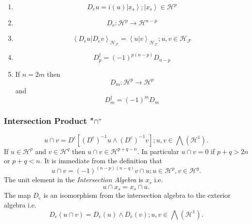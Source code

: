 \documentclass[aps,preprint]{revtex4}%
\begin{document}
\begin{enumerate}
\item
\begin{equation}
D_{e}u=i\left(  u\right)  \left\vert x_{s}\right\rangle ;\left\vert
x_{s}\right\rangle \in\mathcal{H}^{p}%
\end{equation}


\item
\begin{equation}
D_{e}:\mathcal{H}^{p}\rightarrow\mathcal{H}^{n-p}%
\end{equation}


\item
\begin{equation}
\left\langle \left.  D_{e}u\right\vert D_{e}v\right\rangle _{\mathcal{H}%
_{\mathcal{F}}}=\left\langle \left.  u\right\vert v\right\rangle
_{\mathcal{H}_{\mathcal{F}}};u,v\in\mathcal{H}_{\mathcal{F}}%
\end{equation}


\item
\begin{equation}
D_{p}^{\dagger}=\left(  -1\right)  ^{p\left(  n-p\right)  }D_{n-p}%
\end{equation}


\item If $n=2m$ then
\begin{equation}
D_{m}:\mathcal{H}^{p}\rightarrow\mathcal{H}^{p}%
\end{equation}
and%
\begin{equation}
D_{m}^{\dagger}=\left(  -1\right)  ^{m}D_{m}%
\end{equation}

\end{enumerate}

\subsubsection{Intersection Product "$\cap"$}%

\begin{equation}
u\cap v=D^{e}\left[  \left(  D^{e}\right)  ^{-1}u\wedge\left(  D^{e}\right)
^{-1}v\right]  ;u,v\in%
{\textstyle\bigwedge}
\left(  \mathcal{H}^{1}\right)  .
\end{equation}
If $u\in\mathcal{H}^{p}$ and $v\in\mathcal{H}^{q}$ then $u\cap v\in
\mathcal{H}^{p+q-n}.$ In particular $u\cap v=0$ if $p+q>2n$ or $p+q<n.$ It is
immediate from the definition that
\begin{equation}
u\cap v=\left(  -1\right)  ^{\left(  n-p\right)  \left(  n-q\right)  }v\cap
u;u\in\mathcal{H}^{p},v\in\mathcal{H}^{q}.
\end{equation}
The unit element in the \emph{Intersection Algebra} is $x_{s}$ i.e.
\begin{equation}
u\cap x_{s}=x_{s}\cap u.
\end{equation}
The map $D_{e}$ is an isomorphism from the intersection algebra to the
exterior algebra i.e.
\begin{equation}
D_{e}\left(  u\cap v\right)  =D_{e}\left(  u\right)  \wedge D_{e}\left(
v\right)  ;u,v\in%
{\textstyle\bigwedge}
\left(  \mathcal{H}^{1}\right)  .
\end{equation}
\end{document}
